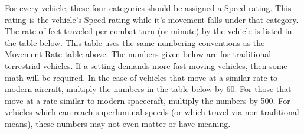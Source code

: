 \documentclass[oneside]{book}
\begin{document}
\begin{multicols}{2}
For every vehicle, these four categories should be assigned a Speed rating. This rating is the vehicle's Speed rating while it's movement falls under that category. The rate of feet traveled per combat turn (or minute) by the vehicle is listed in the table below. This table uses the same numbering conventions as the Movement Rate table above. The numbers given below are for traditional terrestrial vehicles. If a setting demands more fast-moving vehicles, then some math will be required. In the case of vehicles that move at a similar rate to modern aircraft, multiply the numbers in the table below by 60. For those that move at a rate similar to modern spacecraft, multiply the numbers by 500. For vehicles which can reach superluminal speeds (or which travel via non-traditional means), these numbers may not even matter or have meaning.

\end{multicols}
\end{document}
